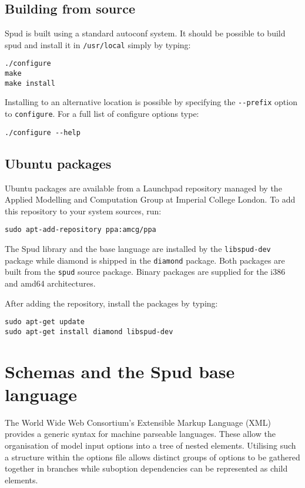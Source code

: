 \documentclass[a4paper, 11pt]{book}
\begin{document}
\section{Building from source}

Spud is built using a standard autoconf system. It should be possible to
build spud and install it in \verb+/usr/local+ simply by typing:

\begin{verbatim}
./configure
make
make install
\end{verbatim}

Installing to an alternative location is possible by specifying the
\verb+--prefix+ option to \verb+configure+. For a full list of configure
options type:

\begin{verbatim}
./configure --help
\end{verbatim}

\section{Ubuntu packages}

Ubuntu packages are available from a Launchpad repository managed by the Applied Modelling and Computation
Group at Imperial College London. To add this repository to your system sources, run:

\begin{verbatim}
sudo apt-add-repository ppa:amcg/ppa
\end{verbatim}

The Spud library and the base language are installed by the
\verb+libspud-dev+ package while diamond is shipped in the \verb+diamond+
package. Both packages are built from the \verb+spud+ source package. Binary
packages are supplied for the i386 and amd64 architectures.

After adding the repository, install the
packages by typing:

\begin{verbatim}
sudo apt-get update
sudo apt-get install diamond libspud-dev
\end{verbatim}

\chapter{Schemas and the Spud base language}
\lstset{language=rnc}

The World Wide Web Consortium's Extensible Markup Language (XML) provides a
generic syntax for machine parseable languages.  These allow the
organisation of model input options into a tree of nested elements.
Utilising such a structure within the options file allows distinct groups of
options to be gathered together in branches while suboption dependencies can
be represented as child elements.
\end{document}
